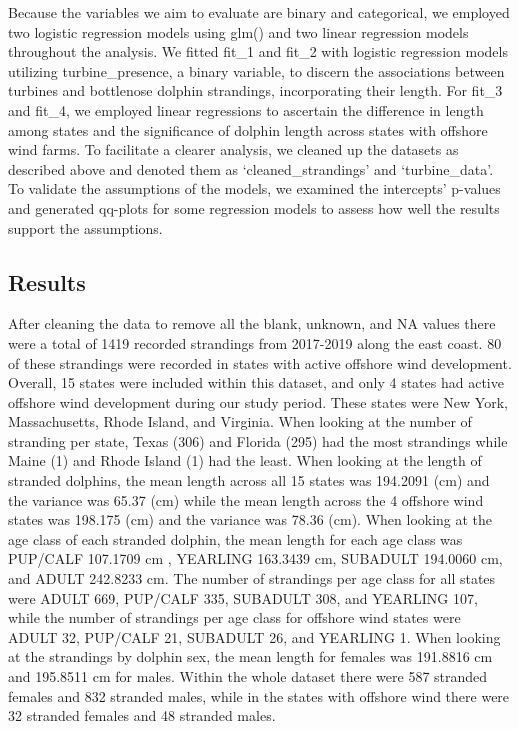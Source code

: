 \documentclass[
]{article}
\begin{document}
Because the variables we aim to evaluate are binary and categorical, we
employed two logistic regression models using glm() and two linear
regression models throughout the analysis. We fitted fit\_1 and fit\_2
with logistic regression models utilizing turbine\_presence, a binary
variable, to discern the associations between turbines and bottlenose
dolphin strandings, incorporating their length. For fit\_3 and fit\_4,
we employed linear regressions to ascertain the difference in length
among states and the significance of dolphin length across states with
offshore wind farms. To facilitate a clearer analysis, we cleaned up the
datasets as described above and denoted them as `cleaned\_strandings'
and `turbine\_data'. To validate the assumptions of the models, we
examined the intercepts' p-values and generated qq-plots for some
regression models to assess how well the results support the
assumptions.

\hypertarget{results}{%
\subsection{Results}\label{results}}

After cleaning the data to remove all the blank, unknown, and NA values
there were a total of 1419 recorded strandings from 2017-2019 along the
east coast. 80 of these strandings were recorded in states with active
offshore wind development. Overall, 15 states were included within this
dataset, and only 4 states had active offshore wind development during
our study period. These states were New York, Massachusetts, Rhode
Island, and Virginia. When looking at the number of stranding per state,
Texas (306) and Florida (295) had the most strandings while Maine (1)
and Rhode Island (1) had the least. When looking at the length of
stranded dolphins, the mean length across all 15 states was 194.2091
(cm) and the variance was 65.37 (cm) while the mean length across the 4
offshore wind states was 198.175 (cm) and the variance was 78.36 (cm).
When looking at the age class of each stranded dolphin, the mean length
for each age class was PUP/CALF 107.1709 cm , YEARLING 163.3439 cm,
SUBADULT 194.0060 cm, and ADULT 242.8233 cm. The number of strandings
per age class for all states were ADULT 669, PUP/CALF 335, SUBADULT 308,
and YEARLING 107, while the number of strandings per age class for
offshore wind states were ADULT 32, PUP/CALF 21, SUBADULT 26, and
YEARLING 1. When looking at the strandings by dolphin sex, the mean
length for females was 191.8816 cm and 195.8511 cm for males. Within the
whole dataset there were 587 stranded females and 832 stranded males,
while in the states with offshore wind there were 32 stranded females
and 48 stranded males.
\end{document}

